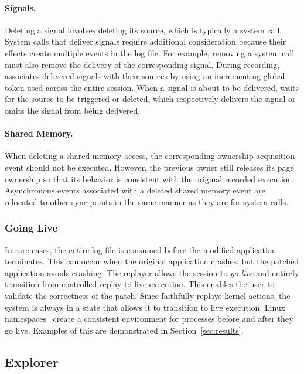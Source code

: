 \paragraph{Signals.}
Deleting a signal involves deleting its source, which is typically a
system call. System calls that deliver signals require additional
consideration because their effects create multiple events in the log
file.  For example, removing a  system call must also
remove the delivery of the corresponding signal.  During recording,
{\dora} associates delivered signals with their sources by using an
incrementing global token used across the entire session.
When a signal is about to be delivered, {\dora} waits for the
source to be triggered or deleted, which respectively delivers the
signal or omits the signal from being delivered. 

\paragraph{Shared Memory.}
When deleting a shared memory access, the corresponding ownership
acquisition event should not be executed.  However, the previous owner
still releases its page ownership so that its behavior is consistent
with the original recorded execution. Asynchronous events associated with a
deleted shared memory event are relocated to other sync points in the same
manner as they are for system calls.

\subsubsection{Going Live}
In rare cases, the entire log file is
consumed before the modified application terminates. This can occur when the
original application crashes, but the patched application avoids crashing. The
replayer allows the session to \emph{go live} and entirely transition from
controlled replay to live execution. This enables the user to
validate the correctness of the patch.
Since {\dora} faithfully replays kernel actions, the system is always in a state that allows
it to transition to live execution. Linux namespaces~\cite{namespaces:linux06}
create a consistent environment for processes before and after they go live.
Examples of this are demonstrated in Section~\ref{sec:results}.
\subsection{Explorer}
\label{sec:explorer}

